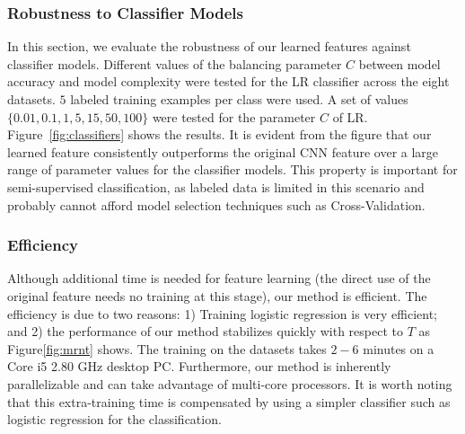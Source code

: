\documentclass[preprint,12pt,3p]{elsarticle}
\begin{document}

\subsubsection{Robustness to Classifier Models}
In this section, we evaluate the robustness of our learned features
against classifier models. Different values of the balancing parameter
$C$ between model accuracy and model complexity were tested for the LR
classifier across the eight datasets.  $5$ labeled training examples
per class were used.  A set of values $\{0.01, 0.1, 1, 5, 15, 50,
100\}$ were tested for the parameter $C$ of LR. Figure~\ref{fig:classifiers}
shows the results. It is evident from the figure that our learned
feature consistently outperforms the original CNN feature over a large
range of parameter values for the classifier models. This property is
important for semi-supervised classification, as labeled data is
limited in this scenario and probably cannot afford model selection
techniques such as Cross-Validation.


 \subsubsection{Efficiency}
 Although additional time is needed for feature learning (the direct use of
 the original feature needs no training at this stage), our method is efficient. The efficiency is due to two reasons: 1) Training
 logistic regression is very efficient; and 2) the performance of our
 method stabilizes quickly with respect to $T$ as Figure\ref{fig:mrnt}
 shows. The training on the datasets takes $2-6$ minutes on a Core i5
 2.80 GHz desktop PC. Furthermore, our method is inherently
 parallelizable and can take advantage of multi-core processors. It is
 worth noting that this extra-training time is compensated by using a
 simpler classifier such as logistic regression for the
 classification.
\end{document}
